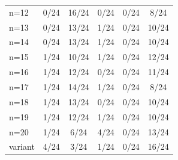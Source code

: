 \begin{tabular}{lccccc}
n=12 & \cellcolor[HTML]{FFFFFF} 0/24 & \cellcolor[HTML]{EA4646} 16/24 & \cellcolor[HTML]{9670BD} 0/24 & \cellcolor[HTML]{8FEB32} 0/24 & \cellcolor[HTML]{19C8C8} 8/24 \\
n=13 & \cellcolor[HTML]{FFFFFF} 0/24 & \cellcolor[HTML]{EA4646} 13/24 & \cellcolor[HTML]{9670BD} 1/24 & \cellcolor[HTML]{8FEB32} 0/24 & \cellcolor[HTML]{19C8C8} 10/24 \\
n=14 & \cellcolor[HTML]{FFFFFF} 0/24 & \cellcolor[HTML]{EA4646} 13/24 & \cellcolor[HTML]{9670BD} 1/24 & \cellcolor[HTML]{8FEB32} 0/24 & \cellcolor[HTML]{19C8C8} 10/24 \\
n=15 & \cellcolor[HTML]{FFFFFF} 1/24 & \cellcolor[HTML]{EA4646} 10/24 & \cellcolor[HTML]{9670BD} 1/24 & \cellcolor[HTML]{8FEB32} 0/24 & \cellcolor[HTML]{19C8C8} 12/24 \\
n=16 & \cellcolor[HTML]{FFFFFF} 1/24 & \cellcolor[HTML]{EA4646} 12/24 & \cellcolor[HTML]{9670BD} 0/24 & \cellcolor[HTML]{8FEB32} 0/24 & \cellcolor[HTML]{19C8C8} 11/24 \\
n=17 & \cellcolor[HTML]{FFFFFF} 1/24 & \cellcolor[HTML]{EA4646} 14/24 & \cellcolor[HTML]{9670BD} 1/24 & \cellcolor[HTML]{8FEB32} 0/24 & \cellcolor[HTML]{19C8C8} 8/24 \\
n=18 & \cellcolor[HTML]{FFFFFF} 1/24 & \cellcolor[HTML]{EA4646} 13/24 & \cellcolor[HTML]{9670BD} 0/24 & \cellcolor[HTML]{8FEB32} 0/24 & \cellcolor[HTML]{19C8C8} 10/24 \\
n=19 & \cellcolor[HTML]{FFFFFF} 1/24 & \cellcolor[HTML]{EA4646} 12/24 & \cellcolor[HTML]{9670BD} 1/24 & \cellcolor[HTML]{8FEB32} 0/24 & \cellcolor[HTML]{19C8C8} 10/24 \\
n=20 & \cellcolor[HTML]{FFFFFF} 1/24 & \cellcolor[HTML]{EA4646} 6/24 & \cellcolor[HTML]{9670BD} 4/24 & \cellcolor[HTML]{8FEB32} 0/24 & \cellcolor[HTML]{19C8C8} 13/24 \\
variant & \cellcolor[HTML]{FFFFFF} 4/24 & \cellcolor[HTML]{EA4646} 3/24 & \cellcolor[HTML]{9670BD} 1/24 & \cellcolor[HTML]{8FEB32} 0/24 & \cellcolor[HTML]{19C8C8} 16/24 \\
\bottomrule
\end{tabular}
